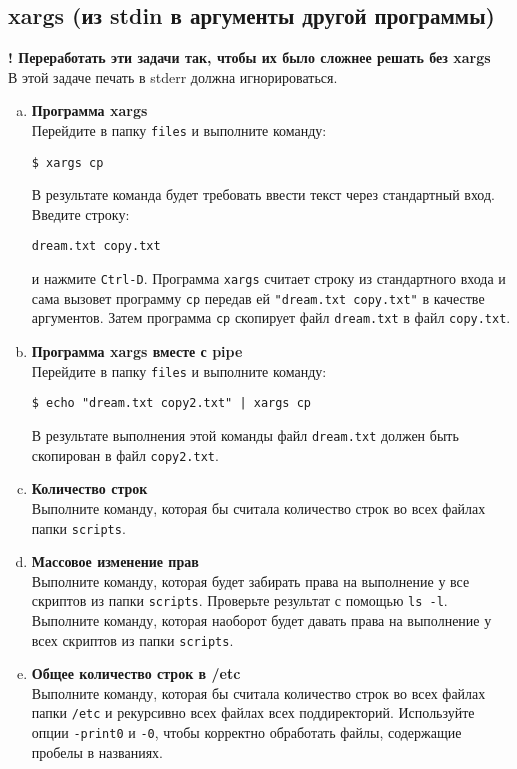 \documentclass{article}
\begin{document}
\subsection{xargs (из stdin в аргументы другой программы)}
\textbf{! Переработать эти задачи так, чтобы их было сложнее решать без xargs}\\
В этой задаче печать в stderr должна игнорироваться.
\begin{enumerate}[a.]
\item \textbf{Программа xargs}\\
Перейдите в папку \texttt{files} и выполните команду:
\begin{lstlisting}
$ xargs cp
\end{lstlisting}
В результате команда будет требовать ввести текст через стандартный вход. Введите строку:
\begin{lstlisting}
dream.txt copy.txt
\end{lstlisting}
и нажмите \texttt{Ctrl-D}. Программа \texttt{xargs} считает строку из стандартного входа и сама вызовет программу \texttt{cp} передав ей \texttt{"dream.txt copy.txt"} в качестве аргументов. Затем программа \texttt{cp} скопирует файл \texttt{dream.txt} в файл \texttt{copy.txt}.

\item \textbf{Программа xargs вместе с pipe}\\
Перейдите в папку \texttt{files} и выполните команду:
\begin{lstlisting}
$ echo "dream.txt copy2.txt" | xargs cp
\end{lstlisting}
В результате выполнения этой команды файл \texttt{dream.txt} должен быть скопирован в файл \texttt{copy2.txt}.

\item \textbf{Количество строк}\\
Выполните команду, которая бы считала количество строк во всех файлах папки \texttt{scripts}.

\item \textbf{Массовое изменение прав}\\
Выполните команду, которая будет забирать права на выполнение у все скриптов из папки \texttt{scripts}. Проверьте результат с помощью \texttt{ls -l}. Выполните команду, которая наоборот будет давать права на выполнение у всех скриптов из папки \texttt{scripts}.

\item \textbf{Общее количество строк в /etc}\\
Выполните команду, которая бы считала количество строк во всех файлах папки \texttt{/etc} и рекурсивно всех файлах всех поддиректорий. Используйте опции \texttt{-print0} и \texttt{-0}, чтобы корректно обработать файлы, содержащие пробелы в названиях. 


\end{enumerate}
\end{document}

